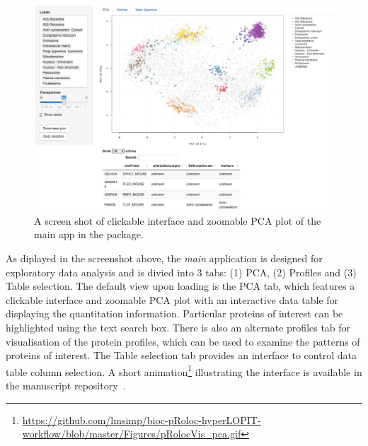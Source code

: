 \begin{knitrout}
\color{fgcolor}\begin{kframe}
\begin{alltt}
\hlstd{(}\hlstd{)}
\end{alltt}
\end{kframe}
\end{knitrout}

\begin{figure}[!ht]
  \centering
  \includegraphics[width=\textwidth]{./Figures/mainapp.png}
  \caption{A screen shot of clickable interface and zoomable PCA plot
    of the main app in the  package. }
  \label{fig:app}
\end{figure}

As diplayed in the screenshot above, the \textit{main} application is
designed for exploratory data analysis and is divied into 3 tabs: (1)
PCA, (2) Profiles and (3) Table selection. The default view upon
loading is the PCA tab, which features a clickable interface and
zoomable PCA plot with an interactive data table for displaying the
quantitation information. Particular proteins of interest can be
highlighted using the text search box. There is also an alternate
profiles tab for visualisation of the protein profiles, which can be
used to examine the patterns of proteins of interest. The Table
selection tab provides an interface to control data table column
selection. A short
animation\footnote{\url{https://github.com/lmsimp/bioc-pRoloc-hyperLOPIT-workflow/blob/master/Figures/pRolocVis\_pca.gif}}
illustrating the interface is available in the manuscript repository~\cite{ghrepo}.

